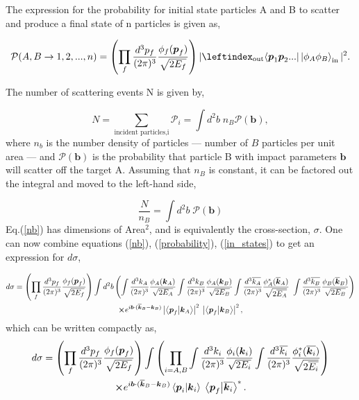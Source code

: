\documentclass[a4paper,11pt]{article}
\begin{document}
The expression for the probability for initial state particles A and B to scatter and produce a final state of n particles is given as, 

\begin{equation}\label{probability}
	\mathcal{P}(A,B \rightarrow 1, 2, ..., n)= \left(\prod_{f} \frac{d^3p_f}{(2\pi)^3} \frac{\phi_f(\boldsymbol{p}_f)}{\sqrt{2E_f}}\right)  |\leftindex_{\text{out}}{\bra{\boldsymbol{p}_1 \boldsymbol{p}_2 ...}}\ket{\phi_A\phi_B}_\text{in}|^2.
\end{equation}				


The number of scattering events N is given by,

$$N = \sum_{\text{incident particles,i}} \mathcal{P}_i = \int d^2b\; n_B \mathcal{P}(\boldsymbol{b}),$$
where  $n_b$ is the number density of particles --- number of $B$ particles per unit area --- and $\mathcal{P}(\boldsymbol{b})$ is the probability that particle B with impact parameters $\boldsymbol{b}$ will scatter off the target A. Assuming that $n_B$ is constant, it can be factored out the integral and moved to the left-hand side, 

\begin{equation}\label{nb}
	\frac{N}{n_B} =\int d^2b\; \mathcal{P}(\boldsymbol{b}) 
\end{equation}
Eq.(\ref{nb}) has dimensions of Area$^{2}$, and is equivalently the cross-section, $\sigma.$ One can now combine equations (\ref{nb}), (\ref{probability}), (\ref{in_states}) to get an expression for $d\sigma$,

\begin{gather*}
		d\sigma = \left(\prod_{f} \frac{d^3p_f}{(2\pi)^3} \frac{\phi_f(\boldsymbol{p}_f)}{\sqrt{2E_f}}\right) 
		\int d^2b \left(  \int \frac{d^3k_A}{(2\pi)^3}\frac{\phi_A(\boldsymbol{k}_A)}{\sqrt{2E_A}} \int  \frac{d^3k_B}{(2\pi)^3}\frac{\phi_A(\boldsymbol{k}_B)}{\sqrt{2E_B}} \int \frac{d^3\overline{k_A}}{(2\pi)^3} \frac{\phi^*_A(\overline{\boldsymbol{k}}_A)}{\sqrt{2\overline{E_A}}}\			\int \frac{d^3\overline{k_B}}{(2\pi)^3}\frac{\phi_B(\overline{\boldsymbol{k}}_B)}{\sqrt{2E_B}}\right)\\ 			
		\cross e^{i\boldsymbol{b}\cdot(\overline{\boldsymbol{k}}_B - \boldsymbol{k}_B)}	\left|\bra{\boldsymbol{p}_f}\ket{\boldsymbol{k}_A}\right|^2 \; \left|\bra{\boldsymbol{p}_f}\ket{\boldsymbol{k}_B}\right|^2,
\end{gather*}
which can be written compactly as,
\begin{equation}
	\begin{gathered}\label{final}
		d\sigma = \left(\prod_{f} \frac{d^3p_f}{(2\pi)^3} \frac{\phi_f(\boldsymbol{p}_f)}{\sqrt{2E_f}}\right) 
		\int \left(\prod_{i =A,B} \int \frac{d^3k_i}{(2\pi)^3}\frac{\phi_i(\boldsymbol{k}_i)}{\sqrt{2E_i}} \int  \frac{d^3\overline{k_i}}{(2\pi)^3}\frac{\phi^*_i(\overline{\boldsymbol{k}_i})}{\sqrt{2\overline{E_i}}}\right) \\
		\cross e^{i\boldsymbol{b}\cdot(\overline{\boldsymbol{k}}_B - \boldsymbol{k}_B)} \bra{\boldsymbol{p}_i}\ket{\boldsymbol{k}_i}\; \bra{\boldsymbol{p}_f}\ket{\overline{\boldsymbol{k}_i}}^*. 
	\end{gathered}
\end{equation}
\end{document}
